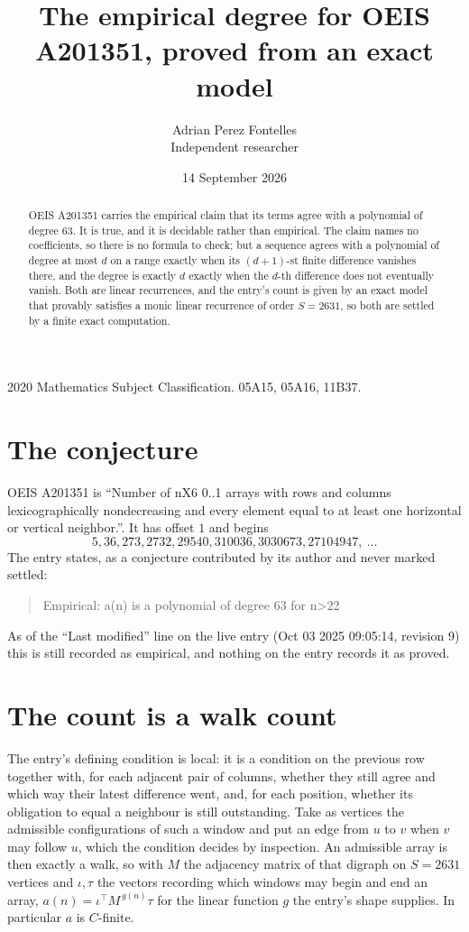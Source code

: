 \documentclass[11pt,a4paper]{article}
\title{The empirical degree for OEIS A201351, proved from an exact model}
\author{Adrian Perez Fontelles\\ \small Independent researcher}
\date{14 September 2026}
\theoremstyle{plain}
\theoremstyle{definition}
\begin{document}
\maketitle

\begin{abstract}
OEIS A201351 carries the empirical claim that its terms agree with a polynomial of degree $63$.
It is true, and it is decidable rather than empirical. The claim names no coefficients, so
there is no formula to check; but a sequence agrees with a polynomial of degree at most $d$ on
a range exactly when its $(d+1)$-st finite difference vanishes there, and the degree is exactly
$d$ exactly when the $d$-th difference does not eventually vanish. Both are linear recurrences,
and the entry's count is given by an exact model that provably satisfies a monic linear
recurrence of order $S=2631$, so both are settled by a finite exact computation.
\end{abstract}

\noindent\small 2020 Mathematics Subject Classification. 05A15, 05A16, 11B37.\normalsize

\section{The conjecture}

OEIS A201351 is ``Number of nX6 0..1 arrays with rows and columns lexicographically nondecreasing and every element equal to at least one horizontal or vertical neighbor.''. It has offset $1$ and begins
\[
5, 36, 273, 2732, 29540, 310036, 3030673, 27104947,\ \dots
\]
The entry states, as a conjecture contributed by its author and never marked settled:
\begin{quote}
Empirical: a(n) is a polynomial of degree 63 for n>22
\end{quote}
As of the ``Last modified'' line on the live entry (Oct 03 2025 09:05:14, revision 9)
this is still recorded as empirical, and nothing on the entry records it as proved.

\section{The count is a walk count}

The entry's defining condition is local: it is a condition on the previous row together with, for each adjacent pair of columns, whether they still agree and which way their latest difference went, and, for each position, whether its obligation to equal a neighbour is still outstanding. Take as vertices the
admissible configurations of such a window and put an edge from $u$ to $v$ when $v$ may follow
$u$, which the condition decides by inspection. An admissible array is then exactly a walk, so
with $M$ the adjacency matrix of that digraph on $S=2631$ vertices and $\iota,\tau$ the vectors
recording which windows may begin and end an array, $a(n)=\iota^{\!\top}M^{\,g(n)}\tau$ for
the linear function $g$ the entry's shape supplies. In particular $a$ is $C$-finite.
\end{document}

